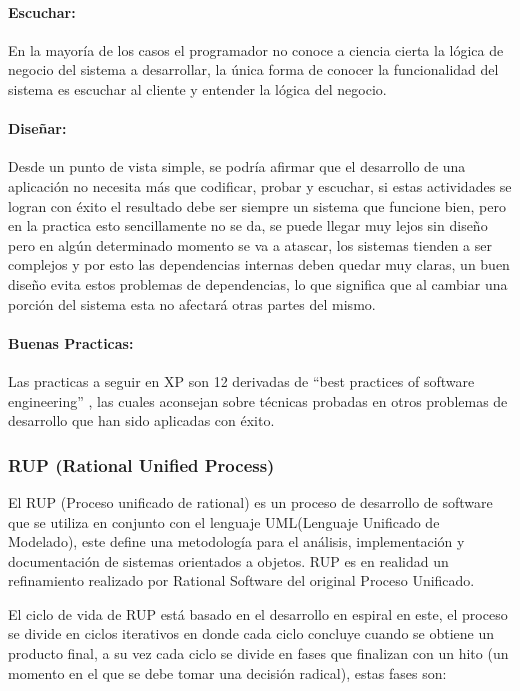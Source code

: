 \paragraph{Escuchar:} En la mayoría de los casos el programador no conoce a ciencia cierta la lógica de negocio del sistema a desarrollar, la única forma de conocer la funcionalidad del sistema es escuchar al cliente y entender la lógica del negocio.

\paragraph{Diseñar:} Desde un punto de vista simple, se podría afirmar que el desarrollo de una aplicación no necesita más que codificar, probar y escuchar, si estas actividades se logran con éxito el resultado debe ser siempre un sistema que funcione bien, pero en la practica esto sencillamente no se da, se puede llegar muy lejos sin diseño pero en algún determinado momento se va a atascar, los sistemas tienden a ser complejos y por esto las dependencias internas deben quedar muy claras, un buen diseño evita estos problemas de dependencias, lo que significa que al cambiar una porción del sistema esta no afectará otras partes del mismo.

\paragraph{Buenas Practicas:} Las practicas a seguir en XP son 12 \cite{xp_practices} derivadas de ``best practices of software engineering'' \cite{best_practices}, las cuales aconsejan sobre técnicas probadas en otros problemas de desarrollo que han sido aplicadas con éxito.


\subsubsection*{RUP (Rational Unified Process) \cite{rup}}

El RUP (Proceso unificado de rational) es un proceso de desarrollo de software que se utiliza en conjunto con el lenguaje UML(Lenguaje Unificado de Modelado), este define una metodología para el análisis, implementación y documentación de sistemas orientados a objetos. RUP es en realidad un refinamiento realizado por Rational Software del original Proceso Unificado.

El ciclo de vida de RUP está basado en el desarrollo en espiral en este, el proceso se divide en ciclos iterativos en donde cada ciclo concluye cuando se obtiene un producto final, a su vez cada ciclo se divide en fases que finalizan con un hito (un momento en el que se debe tomar una decisión radical), estas fases son: 

